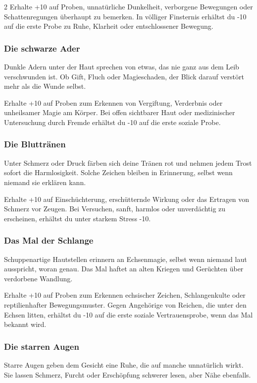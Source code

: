 {\begin{multicols*}{2}
        \malspielwertebox
        {Erhalte +10 auf Proben, unnatürliche Dunkelheit, verborgene Bewegungen oder Schattenregungen überhaupt zu bemerken.}
        {In völliger Finsternis erhältst du -10 auf die erste Probe zu Ruhe, Klarheit oder entschlossener Bewegung.}

        \subsubsection*{Die schwarze Ader}
        Dunkle Adern unter der Haut sprechen von etwas, das nie ganz aus dem Leib verschwunden ist. Ob Gift, Fluch oder Magieschaden, der Blick darauf verstört mehr als die Wunde selbst.

        \malspielwertebox
        {Erhalte +10 auf Proben zum Erkennen von Vergiftung, Verderbnis oder unheilsamer Magie am Körper.}
        {Bei offen sichtbarer Haut oder medizinischer Untersuchung durch Fremde erhältst du -10 auf die erste soziale Probe.}

        \subsubsection*{Die Bluttränen}
        Unter Schmerz oder Druck färben sich deine Tränen rot und nehmen jedem Trost sofort die Harmlosigkeit. Solche Zeichen bleiben in Erinnerung, selbst wenn niemand sie erklären kann.

        \malspielwertebox
        {Erhalte +10 auf Einschüchterung, erschütternde Wirkung oder das Ertragen von Schmerz vor Zeugen.}
        {Bei Versuchen, sanft, harmlos oder unverdächtig zu erscheinen, erhältst du unter starkem Stress -10.}

        \subsubsection*{Das Mal der Schlange}
        Schuppenartige Hautstellen erinnern an Echsenmagie, selbst wenn niemand laut ausspricht, woran genau. Das Mal haftet an alten Kriegen und Gerüchten über verdorbene Wandlung.

        \malspielwertebox
        {Erhalte +10 auf Proben zum Erkennen echsischer Zeichen, Schlangenkulte oder reptilienhafter Bewegungsmuster.}
        {Gegen Angehörige von Reichen, die unter den Echsen litten, erhältst du -10 auf die erste soziale Vertrauensprobe, wenn das Mal bekannt wird.}

        \subsubsection*{Die starren Augen}
        Starre Augen geben dem Gesicht eine Ruhe, die auf manche unnatürlich wirkt. Sie lassen Schmerz, Furcht oder Erschöpfung schwerer lesen, aber Nähe ebenfalls.


\end{multicols*}}
